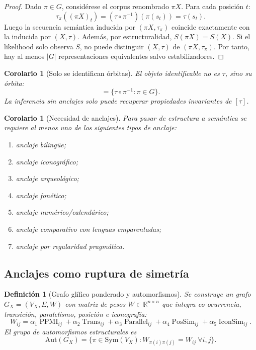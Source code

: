 \documentclass[11pt,a4paper]{article}
\newtheorem{corollary}[theorem]{Corolario}
\newtheorem{definition}[theorem]{Definición}
\newcommand{\R}{\mathbb{R}}
\newcommand{\1}{\mathbf{1}}
\numberwithin{equation}{section}
\begin{document}
\begin{proof}
Dado $\pi\in G$, considérese el corpus renombrado $\pi X$. Para cada posición $t$:
\begin{equation}
    \tau_\pi((\pi X)_t)=(\tau\circ\pi^{-1})(\pi(s_t))=\tau(s_t).
\end{equation}
Luego la secuencia semántica inducida por $(\pi X,\tau_\pi)$ coincide exactamente con la inducida por $(X,\tau)$. Además, por estructuralidad, $S(\pi X)=S(X)$. Si el likelihood solo observa $S$, no puede distinguir $(X,\tau)$ de $(\pi X,\tau_\pi)$. Por tanto, hay al menos $|G|$ representaciones equivalentes salvo estabilizadores.
\end{proof}

\begin{corollary}[Solo se identifican órbitas]
\label{cor:orbits}
El objeto identificable no es $\tau$, sino su órbita:
\begin{equation}
    [\tau]=\{\tau\circ\pi^{-1}:\pi\in G\}.
\end{equation}
La inferencia sin anclajes solo puede recuperar propiedades invariantes de $[\tau]$.
\end{corollary}

\begin{corollary}[Necesidad de anclajes]
Para pasar de estructura a semántica se requiere al menos uno de los siguientes tipos de anclaje:
\begin{enumerate}[label=(\roman*)]
    \item anclaje bilingüe;
    \item anclaje iconográfico;
    \item anclaje arqueológico;
    \item anclaje fonético;
    \item anclaje numérico/calendárico;
    \item anclaje comparativo con lenguas emparentadas;
    \item anclaje por regularidad pragmática.
\end{enumerate}
\end{corollary}

\subsection{Anclajes como ruptura de simetría}

\begin{definition}[Grafo glífico ponderado y automorfismos]
\label{def:glyph_graph}
Se construye un grafo $G_X=(V_X,E,W)$ con matriz de pesos $W\in\R^{n\times n}$ que integra co-ocurrencia, transición, paralelismo, posición e iconografía:
\begin{equation}
    W_{ij}=\alpha_1\operatorname{PPMI}_{ij}+\alpha_2\operatorname{Trans}_{ij}+\alpha_3\operatorname{Parallel}_{ij}+\alpha_4\operatorname{PosSim}_{ij}+\alpha_5\operatorname{IconSim}_{ij}.
\end{equation}
El grupo de automorfismos estructurales es
\begin{equation}
    \mathrm{Aut}(G_X)=\{\pi\in\mathrm{Sym}(V_X):W_{\pi(i)\pi(j)}=W_{ij}\ \forall i,j\}.
\end{equation}
\end{definition}
\end{document}

